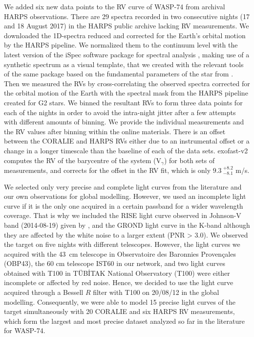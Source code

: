\documentclass[a4paper,fleqn,usenatbib]{mnras}
\begin{document}
We added six new data points to the RV curve of WASP-74 from archival HARPS observations. There are 29 spectra recorded in two consecutive nights (17 and 18 August 2017) in the HARPS public archive lacking RV measurements. We downloaded the 1D-spectra reduced and corrected for the Earth's orbital motion by the HARPS pipeline. We normalized them to the continuum level with the latest version of the iSpec software package for spectral analysis \citep{2014ascl.soft09006B, 2019MNRAS.486.2075B}, making use of a synthetic spectrum as a visual template, that we created with the relevant tools of the same package based on the fundamental parameters of the star from \citet{2018A&A...620A..58S}. Then we measured the RVs by cross-correlating the observed spectra corrected for the orbital motion of the Earth with the spectral mask from the HARPS pipeline created for G2 stars. We binned the resultant RVs to form three data points for each of the nights in order to avoid the intra-night jitter after a few attempts with different amounts of binning. We provide the individual measurements and the RV values after binning within the online materials. There is an offset between the CORALIE and HARPS RVs either due to an instrumental offset or a change in a longer timescale than the baseline of each of the data sets. {\sc exofast}-v2 computes the RV of the barycentre of the system (V$_{\gamma}$) for both sets of measurements, and corrects for the offset in the RV fit, which is only $9.3~^{+8.2}_{-8.1}$ m/s. 

We selected only very precise and complete light curves from the literature and our own observations for global modelling. However, we used an incomplete light curve if it is the only one acquired in a certain passband for a wider wavelength coverage. That is why we included the RISE light curve observed in Johnson-V band (2014-08-19) given by \cite{2015AJ....150...18H}, and the GROND light curve in the K-band \citep{2019MNRAS.485.5168M} although they are affected by the white noise to a larger extent (PNR > 3.0). We observed the target on five nights with different telescopes. However, the light curves we acquired with the 43~cm telescope in Observatoire des Baronnies Proven\c{c}ales (OBP43), the 60 cm telescope IST60 in our network, and two light curves obtained with T100 in T\"UB\.{I}TAK National Observatory (T100) were either incomplete or affected by red noise. Hence, we decided to use the light curve acquired through a Bessell $R$ filter with T100 on 20/08/12 in the global modelling. Consequently, we were able to model 15 precise light curves of the target simultaneously with 20 CORALIE and six HARPS RV measurements, which form the largest and most precise dataset analyzed so far in the literature for WASP-74.  
\end{document}
